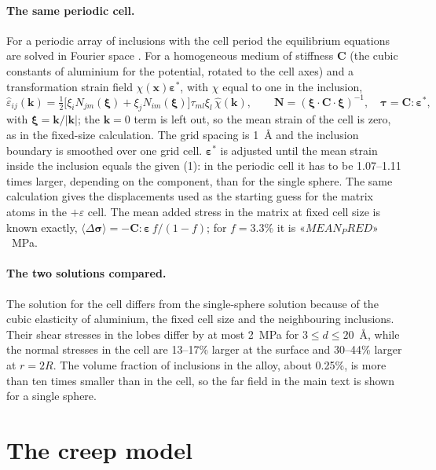\documentclass[11pt,a4paper]{article}
\begin{document}
\paragraph{The same periodic cell.} For a periodic array of inclusions with the
cell period the equilibrium equations are solved in Fourier space
\cite{MoulinecSuquet1998}. For a homogeneous medium of stiffness $\mathbf C$
(the cubic constants of aluminium for the potential, rotated to the cell axes)
and a transformation strain field $\chi(\mathbf x)\boldsymbol\varepsilon^*$, with
$\chi$ equal to one in the inclusion,
\begin{equation}
\hat\varepsilon_{ij}(\mathbf k)=\tfrac12\bigl[\xi_iN_{jm}(\boldsymbol\xi)
+\xi_jN_{im}(\boldsymbol\xi)\bigr]\tau_{ml}\xi_l\,\hat\chi(\mathbf k),
\qquad \mathbf N=(\boldsymbol\xi\cdot\mathbf C\cdot\boldsymbol\xi)^{-1},
\quad \boldsymbol\tau=\mathbf C:\boldsymbol\varepsilon^*,
\end{equation}
with $\boldsymbol\xi=\mathbf k/|\mathbf k|$; the $\mathbf k=0$ term is left out,
so the mean strain of the cell is zero, as in the fixed-size calculation. The
grid spacing is 1~\AA{} and the inclusion boundary is smoothed over one grid
cell. $\boldsymbol\varepsilon^*$ is adjusted until the mean strain inside the
inclusion equals the given (1): in the periodic cell it has to be 1.07--1.11
times larger, depending on the component, than for the single sphere. The same calculation gives the displacements
used as the starting guess for the matrix atoms in the $+\varepsilon$ cell. The
mean added stress in the matrix at fixed cell size is known exactly,
$\langle\Delta\boldsymbol\sigma\rangle=-\mathbf C:\boldsymbol\varepsilon\,f/(1-f)$;
for $f=3.3\%$ it is $«MEAN_PRED»$~MPa.

\paragraph{The two solutions compared.} The solution for the cell differs
from the single-sphere solution because of the cubic elasticity of
aluminium, the fixed cell size and the neighbouring inclusions. Their shear
stresses in the lobes differ by at most 2~MPa for $3\le d\le20$~\AA, while
the normal stresses in the cell are 13--17\% larger at the surface and
30--44\% larger at $r=2R$. The volume fraction of inclusions in the alloy,
about 0.25\%, is more than ten times smaller than in the cell, so the far
field in the main text is shown for a single sphere.

\section{The creep model}
\end{document}
